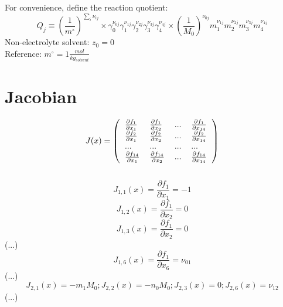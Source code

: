 \documentclass[onecolumn]{article}
\begin{document}
For convenience, define the reaction quotient:\\
\begin{equation}
\label{eq:reaction_quotient}
Q_j \equiv \left(\frac{1}{m^{\circ}}\right)^{\sum_i{\nu_{ij}}}\times
\gamma_0^{\nu_{0j}}\gamma_1^{\nu_{1j}}\gamma_2^{\nu_{2j}}
\gamma_3^{\nu_{3j}}\gamma_4^{\nu_{4j}}\times
\left(\frac{1}{M_0}\right)^{\nu_{0j}}m_1^{\nu_{1j}}m_2^{\nu_{2j}}
m_3^{\nu_{3j}}m_4^{\nu_{4j}}
\end{equation}
Non-electrolyte solvent: $z_0 = 0$ \\
Reference: $m^{\circ} = 1\frac{mol}{kg_{solvent}}$
\section{Jacobian}
\[
J(x) = \left(
\begin{tabular}{llll}
$\frac{\partial{f_1}}{\partial{x_1}}$ &
$\frac{\partial{f_1}}{\partial{x_2}}$ & ... &
$\frac{\partial{f_1}}{\partial{x_{14}}}$\\
$\frac{\partial{f_2}}{\partial{x_1}}$ &
$\frac{\partial{f_2}}{\partial{x_2}}$ & ... &
$\frac{\partial{f_2}}{\partial{x_{14}}}$\\
$...$ & $...$ & $...$ & $...$\\
$\frac{\partial{f_{14}}}{\partial{x_1}}$ &
$\frac{\partial{f_{14}}}{\partial{x_2}}$ & ... &
$\frac{\partial{f_{14}}}{\partial{x_{14}}}$\\
\end{tabular}
\right)
\]\\
\[
J_{1,1}(x) = \frac{\partial{f_{1}}}{\partial{x_1}} =  -1
\]
\[
J_{1,2}(x) = \frac{\partial{f_{1}}}{\partial{x_2}} =  0
\]
\[
J_{1,3}(x) = \frac{\partial{f_{1}}}{\partial{x_2}} =  0
\]
(...)
\[
J_{1,6}(x) = \frac{\partial{f_{1}}}{\partial{x_6}} =  \nu_{01}
\]
(...)
\[
J_{2,1}(x) =  -m_1 M_0;
J_{2,2}(x) =  -n_0 M_0;
J_{2,3}(x) =  0;
J_{2,6}(x) = \nu_{12}
\]
(...)
\end{document}
